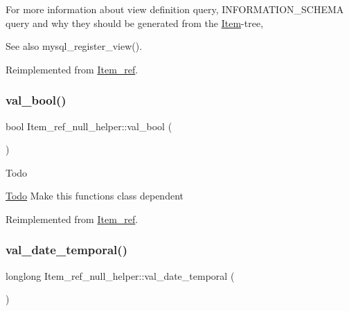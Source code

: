 For more information about view definition query, I\+N\+F\+O\+R\+M\+A\+T\+I\+O\+N\+\_\+\+S\+C\+H\+E\+MA query and why they should be generated from the \mbox{\hyperlink{classItem}{Item}}-\/tree, \begin{DoxySeeAlso}{See also}
mysql\+\_\+register\+\_\+view(). 
\end{DoxySeeAlso}


Reimplemented from \mbox{\hyperlink{classItem__ref_a90c0289e8983ca73c75eaa92bc762cf6}{Item\+\_\+ref}}.

\mbox{\label{classItem__ref__null__helper_ae2f622d4bb13a40800c5293c07f56334}} 
\subsubsection{\texorpdfstring{val\+\_\+bool()}{val\_bool()}}
{\footnotesize\ttfamily bool Item\+\_\+ref\+\_\+null\+\_\+helper\+::val\+\_\+bool (\begin{DoxyParamCaption}{ }\end{DoxyParamCaption})\hspace{0.3cm}{\ttfamily [virtual]}}

\begin{DoxyRefDesc}{Todo}
\item[\mbox{\hyperlink{todo__todo000026}{Todo}}]Make this functions class dependent \end{DoxyRefDesc}


Reimplemented from \mbox{\hyperlink{classItem__ref_af6730f5fe99b99c653a6fa1a66e8cf89}{Item\+\_\+ref}}.

\mbox{\label{classItem__ref__null__helper_ae8e303c9b0015a81a80607ff31cdf57e}} 
\subsubsection{\texorpdfstring{val\+\_\+date\+\_\+temporal()}{val\_date\_temporal()}}
{\footnotesize\ttfamily longlong Item\+\_\+ref\+\_\+null\+\_\+helper\+::val\+\_\+date\+\_\+temporal (\begin{DoxyParamCaption}{ }\end{DoxyParamCaption})\hspace{0.3cm}{\ttfamily [virtual]}}

